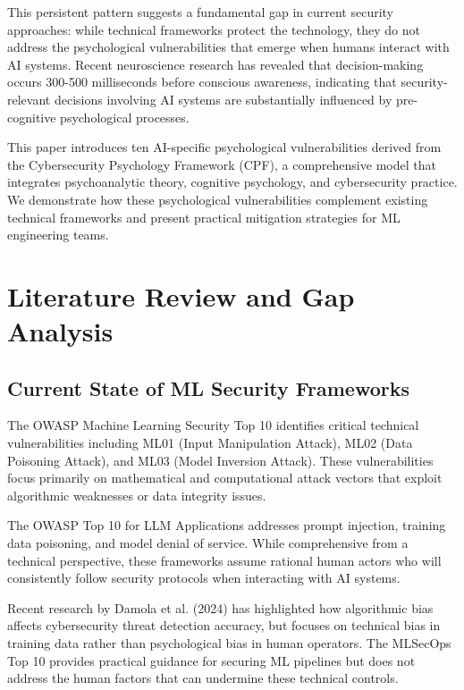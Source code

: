 \documentclass[11pt,a4paper]{article}
\begin{document}
This persistent pattern suggests a fundamental gap in current security approaches: while technical frameworks protect the technology, they do not address the psychological vulnerabilities that emerge when humans interact with AI systems. Recent neuroscience research has revealed that decision-making occurs 300-500 milliseconds before conscious awareness\cite{libet1983, soon2008}, indicating that security-relevant decisions involving AI systems are substantially influenced by pre-cognitive psychological processes.

This paper introduces ten AI-specific psychological vulnerabilities derived from the Cybersecurity Psychology Framework (CPF)\cite{canale2025}, a comprehensive model that integrates psychoanalytic theory, cognitive psychology, and cybersecurity practice. We demonstrate how these psychological vulnerabilities complement existing technical frameworks and present practical mitigation strategies for ML engineering teams.

\section{Literature Review and Gap Analysis}

\subsection{Current State of ML Security Frameworks}

The OWASP Machine Learning Security Top 10 identifies critical technical vulnerabilities including ML01 (Input Manipulation Attack), ML02 (Data Poisoning Attack), and ML03 (Model Inversion Attack)\cite{owasp2024ml}. These vulnerabilities focus primarily on mathematical and computational attack vectors that exploit algorithmic weaknesses or data integrity issues.

The OWASP Top 10 for LLM Applications addresses prompt injection, training data poisoning, and model denial of service\cite{owasp2024llm}. While comprehensive from a technical perspective, these frameworks assume rational human actors who will consistently follow security protocols when interacting with AI systems.

Recent research by Damola et al. (2024) has highlighted how algorithmic bias affects cybersecurity threat detection accuracy, but focuses on technical bias in training data rather than psychological bias in human operators\cite{damola2024}. The MLSecOps Top 10 provides practical guidance for securing ML pipelines but does not address the human factors that can undermine these technical controls\cite{mlsecops2024}.
\end{document}
